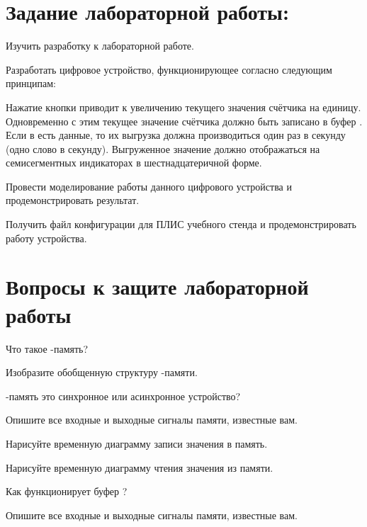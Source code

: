

\section{Задание лабораторной работы:}

\par{Изучить разработку к лабораторной работе.}

\par{Разработать цифровое устройство, функционирующее согласно следующим принципам:}

\par{Нажатие кнопки приводит к увеличению текущего значения счётчика на единицу. Одновременно с этим текущее значение счётчика должно быть записано в буфер . Если в  есть данные, то их выгрузка должна производиться один раз в секунду (одно слово в секунду). Выгруженное значение должно отображаться на семисегментных индикаторах в шестнадцатеричной форме.}

\par{Провести моделирование работы данного цифрового устройства и продемонстрировать результат.}

\par{Получить файл конфигурации для ПЛИС учебного стенда и продемонстрировать работу устройства.}

\section{Вопросы к защите лабораторной работы}

\par{Что такое -память?}

\par{Изобразите обобщенную структуру -памяти.}

\par{-память это синхронное или асинхронное устройство?}

\par{Опишите все входные и выходные сигналы  памяти, известные вам.}

\par{Нарисуйте временную диаграмму записи значения в  память.}

\par{Нарисуйте временную диаграмму чтения значения из  памяти.}

\par{Как функционирует буфер ?}

\par{Опишите все входные и выходные сигналы  памяти, известные вам.}